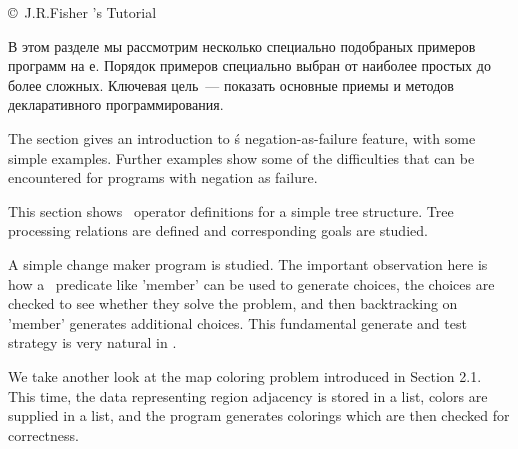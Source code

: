 \secdown

\copyright\ J.R.Fisher 's \prolog
Tutorial\ 

\bigskip





\label{fish2}\secdown

В этом разделе мы рассмотрим несколько специально подобраных примеров программ
на \prolog е. Порядок примеров специально выбран от наиболее простых до более
сложных. Ключевая цель\ --- показать основные приемы 
и методов декларативного программирования. 








 

The section gives an introduction to \prolog\'s negation-as-failure feature, with
some simple examples. Further examples show some of the difficulties that can be
encountered for programs with negation as failure.


This section shows \prolog\ operator definitions for a simple tree structure. Tree
processing relations are defined and corresponding goals are studied.

 
 

A simple change maker program is studied. The important observation here is how
a \prolog\ predicate like 'member' can be used to generate choices, the choices
are checked to see whether they solve the problem, and then backtracking on
'member' generates additional choices. This fundamental generate and test
strategy is very natural in \prolog.


We take another look at the map coloring problem introduced in Section 2.1. This
time, the data representing region adjacency is stored in a list, colors are
supplied in a list, and the program generates colorings which are then checked
for correctness.


